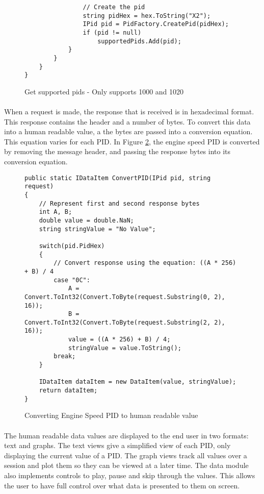 {\begin{figure}[h]
\begin{lstlisting}
				// Create the pid
				string pidHex = hex.ToString("X2");
				IPid pid = PidFactory.CreatePid(pidHex);
				if (pid != null)
					supportedPids.Add(pid);
			}
		}
	}
}
			\end{lstlisting}
			\caption{Get supported pids - Only supports 1000 and 1020}
			\label{code:SupportedPids}
		\end{figure}
		
		\paragraph{}{
		When a request is made, the response that is received is in hexadecimal format. This response contains the header and a number of bytes. To convert this data into a human readable value, a the bytes are passed into a conversion equation. This equation varies for each PID. In Figure \ref{code:ConvertingPids}, the engine speed PID is converted by removing the message header, and passing the response bytes into its conversion equation.
		}
		
		\begin{figure}[h]
			\begin{lstlisting}
public static IDataItem ConvertPID(IPid pid, string request)
{
	// Represent first and second response bytes
	int A, B;
	double value = double.NaN;
	string stringValue = "No Value";
	
	switch(pid.PidHex)
	{
		// Convert response using the equation: ((A * 256) + B) / 4
		case "0C":    
			A = Convert.ToInt32(Convert.ToByte(request.Substring(0, 2), 16));
			B = Convert.ToInt32(Convert.ToByte(request.Substring(2, 2), 16));
			value = ((A * 256) + B) / 4;
			stringValue = value.ToString();
		break;
	}

	IDataItem dataItem = new DataItem(value, stringValue);	
    return dataItem;
}
			\end{lstlisting}
			\caption{Converting Engine Speed PID to human readable value}
			\label{code:ConvertingPids}
		\end{figure}		
			
		\paragraph{}{
		The human readable data values are displayed to the end user in two formats: text and graphs. The text views give a simplified view of each PID, only displaying the current value of a PID. The graph views track all values over a session and plot them so they can be viewed at a later time. The data module also implements controls to play, pause and skip through the values. This allows the user to have full control over what data is presented to them on screen. 
		}
		
}
